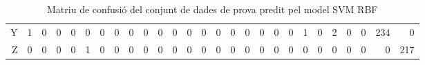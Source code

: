 \begin{table}[ht]
\begin{adjustbox}{max width=\textwidth}
\begin{tabular}{rrrrrrrrrrrrrrrrrrrrrrrrrrr}
  Y &   1 &   0 &   0 &   0 &   0 &   0 &   0 &   0 &   0 &   0 &   0 &   0 &   0 &   0 &   0 &   0 &   0 &   0 &   0 &   1 &   0 &   2 &   0 &   0 & 234 &   0 \\ 
  Z &   0 &   0 &   0 &   0 &   1 &   0 &   0 &   0 &   0 &   0 &   0 &   0 &   0 &   0 &   0 &   0 &   0 &   0 &   0 &   0 &   0 &   0 &   0 &   0 &   0 & 217 \\ 
   \hline
\end{tabular}
\end{adjustbox}
\caption{Matriu de confusió del conjunt de dades de prova predit pel model SVM RBF}
\label{mcfinal}
\end{table}